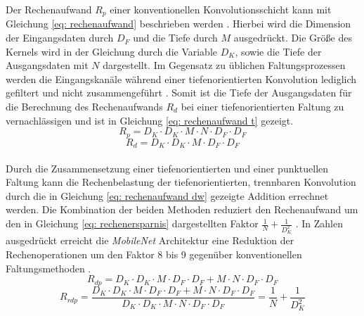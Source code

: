 		
		
		Der Rechenaufwand $R_p$ einer konventionellen Konvolutionsschicht kann mit Gleichung \ref{eq: rechenaufwand} beschrieben werden \cite{mobilenets}. Hierbei wird die Dimension der Eingangsdaten durch $D_F$ und die Tiefe durch $M$ ausgedrückt. Die Größe des Kernels wird in der Gleichung durch die Variable $D_K$, sowie die Tiefe der Ausgangsdaten mit $N$ dargestellt. Im Gegensatz zu üblichen Faltungsprozessen werden die Eingangskanäle während einer tiefenorientierten Konvolution lediglich gefiltert und nicht zusammengeführt \cite{mobilenets}. Somit ist die Tiefe der Ausgangsdaten für die Berechnung des Rechenaufwands $R_d$ bei einer tiefenorientierten Faltung zu vernachlässigen und ist in Gleichung \ref{eq: rechenaufwand t} gezeigt. \\
		
		\begin{equation}
			R_p=D_K \cdot D_K \cdot M \cdot N \cdot D_F \cdot D_F
			\label{eq: rechenaufwand}
		\end{equation}
		\begin{equation}
		R_d=D_K \cdot D_K \cdot M \cdot D_F \cdot D_F
		\label{eq: rechenaufwand t}
		\end{equation}\\
	
		Durch die Zusammensetzung einer tiefenorientierten und einer punktuellen Faltung kann die Rechenbelastung der tiefenorientierten, trennbaren Konvolution durch die in Gleichung \ref{eq: rechenaufwand dw} gezeigte Addition errechnet werden. Die Kombination der beiden Methoden reduziert den Rechenaufwand um den in Gleichung \ref{eq: rechenersparnis} dargestellten Faktor $\frac{1}{N}+\frac{1}{D^2_K}$ \cite{mobilenets}. In Zahlen ausgedrückt erreicht die \textit{MobileNet} Architektur eine Reduktion der Rechenoperationen um den Faktor 8 bis 9 gegenüber konventionellen Faltungsmethoden \cite{mobilenets}.  \\
	
		\begin{equation}
			R_{dp}=D_K \cdot D_K \cdot M \cdot D_F \cdot D_F + M \cdot N \cdot D_F \cdot D_F
			\label{eq: rechenaufwand dw}
		\end{equation}
		\begin{equation}
			R_{rdp}=\frac{D_K \cdot D_K \cdot M \cdot D_F \cdot D_F + M \cdot N \cdot D_F \cdot D_F}{D_K \cdot D_K \cdot M \cdot N \cdot D_F \cdot D_F}=\frac{1}{N}+\frac{1}{D^2_K}
			\label{eq: rechenersparnis}
		\end{equation}\\
		
